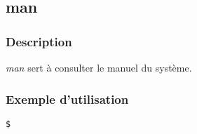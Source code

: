 \subsection*{man}
\subsubsection*{Description}
\emph{man} sert à consulter le manuel du système. 

\subsubsection*{Exemple d'utilisation}

\begin{lstlisting}
$
\end{lstlisting}
